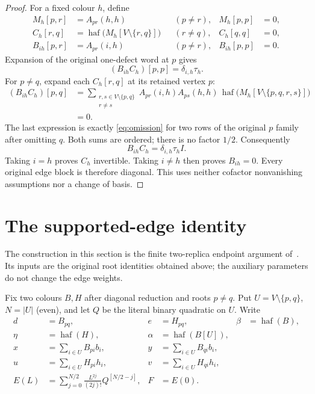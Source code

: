 \documentclass[11pt]{article}
\theoremstyle{definition}
\theoremstyle{plain}
\numberwithin{equation}{section}
\begin{document}
\begin{proof}
For a fixed colour \(h\), define
\[
 \begin{aligned}
 M_h[p,r]&=A_{pr}(h,h) &&(p\ne r),& M_h[p,p]&=0,\\
 C_h[r,q]&=\operatorname{haf}\bigl(M_h[V\setminus\{r,q\}]\bigr)
                  &&(r\ne q),& C_h[q,q]&=0,\\
 B_{ih}[p,r]&=A_{pr}(i,h) &&(p\ne r),& B_{ih}[p,p]&=0.
 \end{aligned}
\]
Expansion of the original one-defect word at \(p\) gives
\[
 (B_{ih}C_h)[p,p]=\delta_{i,h}\tau_h.
\]
For \(p\ne q\), expand each \(C_h[r,q]\) at its retained vertex \(p\):
\begin{equation}
 \begin{aligned}
 (B_{ih}C_h)[p,q]
 &=\sum_{\substack{r,s\in V\setminus\{p,q\}\\r\ne s}}
       A_{pr}(i,h)A_{ps}(h,h)\,
       \operatorname{haf}\bigl(M_h[V\setminus\{p,q,r,s\}]\bigr)\\
 &=0.
 \end{aligned}
 \tag{6}\label{eq:cofactor}
\end{equation}
The last expression is exactly \eqref{eq:omission} for two rows of the
original \(p\) family after omitting \(q\). Both sums are ordered; there
is no factor \(1/2\). Consequently
\[
 B_{ih}C_h=\delta_{i,h}\tau_h I.
\]
Taking \(i=h\) proves \(C_h\) invertible. Taking \(i\ne h\) then proves
\(B_{ih}=0\). Every original edge block is therefore diagonal. This uses
neither cofactor nonvanishing assumptions nor a change of basis.
\end{proof}

\section{The supported-edge identity}\label{sec:endpoint}

The construction in this section is the finite two-replica endpoint argument
of~\cite{endpoint}. Its inputs are the original root identities obtained
above; the auxiliary parameters do not change the edge weights.

Fix two colours \(B,H\) after diagonal reduction and roots \(p\ne q\).
Put \(U=V\setminus\{p,q\}\), \(N=|U|\) (even), and let \(Q\) be the literal
binary quadratic on \(U\). Write
\[
 \begin{aligned}
 d&=B_{pq},&e&=H_{pq},&\beta&=\operatorname{haf}(B),\\
 \eta&=\operatorname{haf}(H),&\alpha&=\operatorname{haf}(B[U]),\\
 x&=\sum_{i\in U}B_{pi}b_i,& y&=\sum_{i\in U}B_{qi}b_i,\\
 u&=\sum_{i\in U}H_{pi}h_i,& v&=\sum_{i\in U}H_{qi}h_i,\\
 E(L)&=\sum_{j=0}^{N/2}\frac{L^{2j}}{(2j)!}Q^{[N/2-j]},&F&=E(0).
 \end{aligned}
\]
\end{document}
